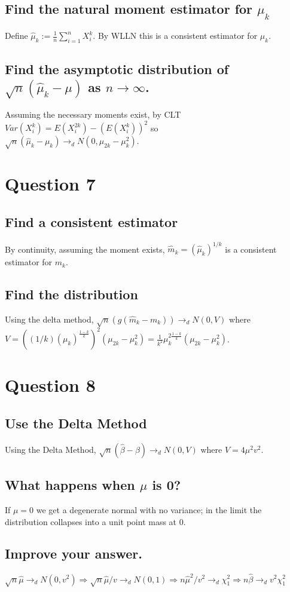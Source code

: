 \documentclass[11pt]{article} %
\begin{document}
\subsection{Find the natural moment estimator for $\mu_k$}
Define $\hat{\mu}_k := \frac{1}{n}\sum_{i=1}^nX_i^k.$ By WLLN this is a consistent estimator for $\mu_k$.
\subsection{Find the asymptotic distribution of $\sqrt{n}(\hat{\mu}_k - \mu)$ as $n\rightarrow \infty$.}
Assuming the necessary moments exist, by CLT $Var(X_i^k) = E(X_i^{2k}) - (E(X_i^k))^2$ so \\$\sqrt{n}(\hat{\mu}_k - \mu_k) \rightarrow_d N(0,\mu_{2k} - \mu_k^2)$.

\section{Question 7}
\subsection{Find a consistent estimator}
By continuity, assuming the moment exists, $\hat{m}_k = (\hat{\mu}_k)^{1/k}$ is a consistent estimator for $m_k$.
\subsection{Find the distribution} %
Using the delta method, $\sqrt{n}(g(\hat{m}_k - m_k)) \rightarrow_{d}N(0,V)$ where $V = ((1/k)  (\mu_k)^{\frac{1-k}{k}})^2(\mu_{2k} - \mu_k^2) =\frac{1}{k^2} \mu_k^{2\frac{1-k}{k}}(\mu_{2k} - \mu_k^2 )$.
\section{Question 8}
\subsection{Use the Delta Method}
Using the Delta Method, $\sqrt{n}(\hat{\beta} - \beta) \rightarrow_d N(0,V)$ where $V= 4\mu^2 v^2$.
\subsection{What happens when $\mu$ is 0?}
If $\mu=0$ we get a degenerate normal with no variance; in the limit the distribution collapses into a unit point mass at 0.
\subsection{Improve your answer.} 
$\sqrt{n}\hat{\mu} \rightarrow_d N(0,v^2) \Rightarrow\sqrt{n}\hat{\mu}/v \rightarrow_d N(0,1)  \Rightarrow n\hat{\mu}^2/v^2 \rightarrow_d \chi^2_1  \Rightarrow n\hat{\beta} \rightarrow_d v^2\chi^2_1 $
\end{document}
